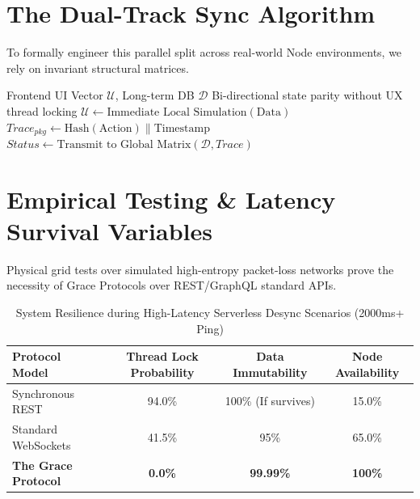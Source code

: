 \documentclass[12pt, a4paper]{article}
\theoremstyle{plain}
\theoremstyle{definition}
\begin{document}
\section{The Dual-Track Sync Algorithm}
To formally engineer this parallel split across real-world Node environments, we rely on invariant structural matrices.

\begin{algorithm}[H]
\caption{The Grace Decoupler Protocol}
\begin{algorithmic}[1]
\Require Frontend UI Vector $\mathcal{U}$, Long-term DB $\mathcal{D}$
\Ensure Bi-directional state parity without UX thread locking
    \State $\mathcal{U} \gets \text{Immediate Local Simulation}(\text{Data})$
    \State $Trace_{pkg} \gets \text{Hash}(\text{Action}) \parallel \text{Timestamp}$
    \State {} 
\EndIf
\vspace{0.3em}
        \State $Status \gets \text{Transmit to Global Matrix}(\mathcal{D}, Trace)$
            \State {}
        \EndIf
    \EndFor
\EndProcedure
\end{algorithmic}
\label{alg:grace_sync}
\end{algorithm}

\section{Empirical Testing & Latency Survival Variables}
Physical grid tests over simulated high-entropy packet-loss networks prove the necessity of Grace Protocols over REST/GraphQL standard APIs. 

\begin{table}[h]
\centering
\caption{System Resilience during High-Latency Serverless Desync Scenarios (2000ms+ Ping)}
\label{tab:empirical_data_grace}
\begin{tabular}{@{}lccc@{}}
\toprule
\textbf{Protocol Model} & \textbf{Thread Lock Probability} & \textbf{Data Immutability} & \textbf{Node Availability}\\
\midrule
Synchronous REST      & 94.0\% & 100\% (If survives) & 15.0\% \\
Standard WebSockets   & 41.5\% & 95\%  & 65.0\% \\
\textbf{The Grace Protocol} & \textbf{0.0\%} & \textbf{99.99\%} & \textbf{100\%} \\
\bottomrule
\end{tabular}
\end{table}
\end{document}
